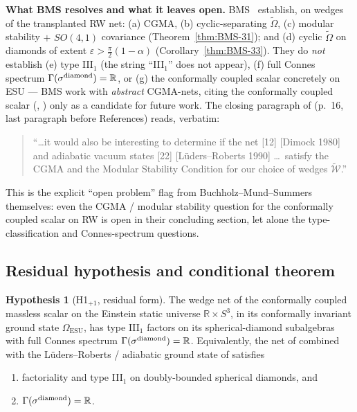 \documentclass[11pt]{article}
\theoremstyle{definition}
\newtheorem{hypothesis}[theorem]{Hypothesis}
\newcommand{\R}{\mathbb{R}}
\newcommand{\ESU}{\mathrm{ESU}}
\begin{document}
\smallskip

\noindent\textbf{What BMS resolves and what it leaves open.} BMS~\cite{BMS2000}
establish, on wedges of the transplanted RW net: (a) CGMA, (b) cyclic-separating
$\widetilde\Omega$, (c) modular stability $+$ $SO(4,1)$ covariance
(Theorem~\ref{thm:BMS-31}); and (d) cyclic $\widetilde\Omega$ on diamonds of
extent $\varepsilon>\frac\pi2(1-\alpha)$ (Corollary~\ref{thm:BMS-33}). They do
\emph{not} establish (e) type III$_1$ (the string ``III$_1$'' does not appear),
(f) full Connes spectrum $\Gamma(\sigma^{\rm diamond})=\R$, or (g) the
conformally coupled scalar concretely on ESU --- BMS work with \emph{abstract}
CGMA-nets, citing the conformally coupled scalar (\cite[ref.~12]{Dimock1980},
\cite[ref.~22]{LudersRoberts1990}) only as a candidate for future work. The
closing paragraph of \cite{BMS2000} (p.~16, last paragraph before References)
reads, verbatim:
\begin{quote}
``\dots it would also be interesting to determine if the net [12]
[Dimock 1980] and adiabatic vacuum states [22] [L\"uders--Roberts 1990]
\dots\ satisfy the CGMA and the Modular Stability Condition for our choice
of wedges $\widetilde{\mathcal W}$.''
\end{quote}
This is the explicit ``open problem'' flag from Buchholz--Mund--Summers
themselves: even the CGMA / modular stability question for the conformally
coupled scalar on RW is open in their concluding section, let alone the
type-classification and Connes-spectrum questions.

\subsection{Residual hypothesis and conditional theorem}\label{sec:H1plus1}

\begin{hypothesis}[H1$_{+1}$, residual form]\label{hyp:H1plus1}
The wedge net of the conformally coupled massless scalar on the Einstein
static universe $\R\times S^3$, in its conformally invariant ground state
$\Omega_\ESU$, has type III$_1$ factors on its spherical-diamond
subalgebras with full Connes spectrum
$\Gamma(\sigma^{\rm diamond})=\R$. Equivalently, the net of
\cite{Dimock1980} combined with the L\"uders--Roberts /
adiabatic ground state of \cite{LudersRoberts1990} satisfies
\begin{enumerate}
\item[(i)] factoriality and type III$_1$ on doubly-bounded spherical
diamonds, and
\item[(ii)] $\Gamma(\sigma^{\rm diamond})=\R$.
\end{enumerate}
\end{hypothesis}
\end{document}
